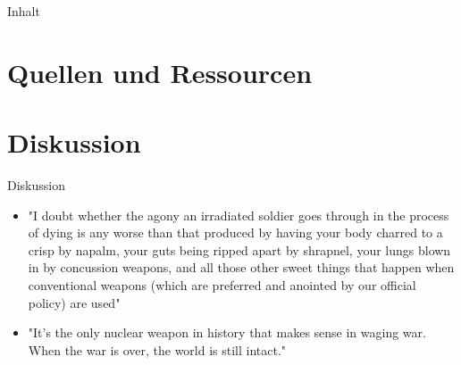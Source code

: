 

\maketitle
	\begin{frame}{Inhalt}
		\tableofcontents
	\end{frame}
	
	
	
	
	\section{Quellen und Ressourcen}
	\printbibliography
	\section{Diskussion}
	\begin{frame}{Diskussion}
		\begin{itemize}
			\item "I doubt whether the agony an irradiated soldier goes through in the process of dying is any worse than that produced by having your body charred to a crisp by napalm, your guts being ripped apart by shrapnel, your lungs blown in by concussion weapons, and all those other sweet things that happen when conventional weapons (which are preferred and anointed by our official policy) are used"
			\item "It’s the only nuclear weapon in history that makes sense in waging war. When the war is over, the world is still intact."
		\end{itemize}
	\end{frame}

